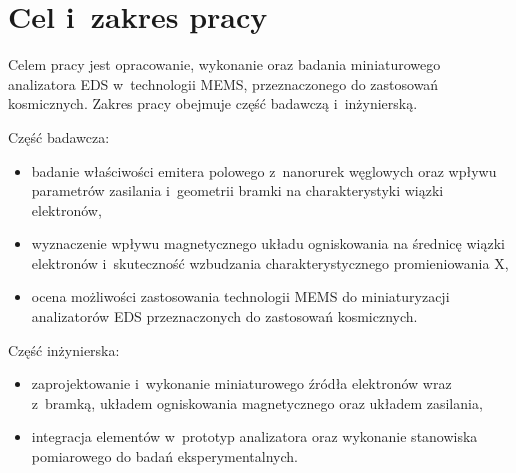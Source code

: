 

\section{Cel i~zakres pracy}
\label{sec:cel}

Celem pracy jest opracowanie, wykonanie oraz badania miniaturowego
analizatora EDS w~technologii MEMS, przeznaczonego do zastosowań
kosmicznych. Zakres pracy obejmuje część badawczą i~inżynierską.

Część badawcza:
\begin{itemize}
  \item badanie właściwości emitera polowego z~nanorurek węglowych oraz
    wpływu parametrów zasilania i~geometrii bramki na charakterystyki
    wiązki elektronów,
  \item wyznaczenie wpływu magnetycznego układu ogniskowania na średnicę
    wiązki elektronów i~skuteczność wzbudzania charakterystycznego
    promieniowania X,
  \item ocena możliwości zastosowania technologii MEMS do miniaturyzacji
    analizatorów EDS przeznaczonych do zastosowań kosmicznych.
\end{itemize}

Część inżynierska:
\begin{itemize}
  \item zaprojektowanie i~wykonanie miniaturowego źródła elektronów wraz
    z~bramką, układem ogniskowania magnetycznego oraz układem zasilania,
  \item integracja elementów w~prototyp analizatora oraz wykonanie
    stanowiska pomiarowego do badań eksperymentalnych.
\end{itemize}
